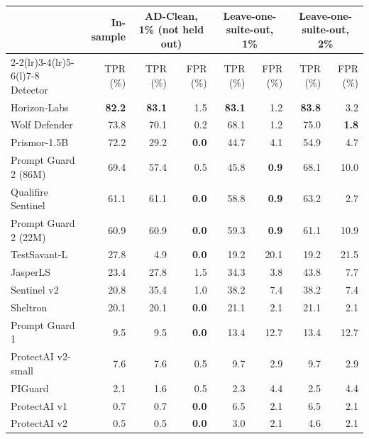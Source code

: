 \begin{tabular*}{\textwidth}{@{\extracolsep{\fill}}lrrrrrrr@{}}
\toprule
 & In-sample & \multicolumn{2}{c}{AD-Clean, 1\% (not held out)} & \multicolumn{2}{c}{Leave-one-suite-out, 1\%} & \multicolumn{2}{c}{Leave-one-suite-out, 2\%} \\
\cmidrule(lr){2-2}\cmidrule(lr){3-4}\cmidrule(lr){5-6}\cmidrule(l){7-8}
Detector & TPR (\%) & TPR (\%) & FPR (\%) & TPR (\%) & FPR (\%) & TPR (\%) & FPR (\%) \\
\midrule
Horizon-Labs & \textbf{82.2} & \textbf{83.1} & 1.5 & \textbf{83.1} & 1.2 & \textbf{83.8} & 3.2 \\
Wolf Defender & 73.8 & 70.1 & 0.2 & 68.1 & 1.2 & 75.0 & \textbf{1.8} \\
Prismor-1.5B & 72.2 & 29.2 & \textbf{0.0} & 44.7 & 4.1 & 54.9 & 4.7 \\
Prompt Guard 2 (86M) & 69.4 & 57.4 & 0.5 & 45.8 & \textbf{0.9} & 68.1 & 10.0 \\
Qualifire Sentinel & 61.1 & 61.1 & \textbf{0.0} & 58.8 & \textbf{0.9} & 63.2 & 2.7 \\
Prompt Guard 2 (22M) & 60.9 & 60.9 & \textbf{0.0} & 59.3 & \textbf{0.9} & 61.1 & 10.9 \\
TestSavant-L & 27.8 & 4.9 & \textbf{0.0} & 19.2 & 20.1 & 19.2 & 21.5 \\
JasperLS & 23.4 & 27.8 & 1.5 & 34.3 & 3.8 & 43.8 & 7.7 \\
Sentinel v2 & 20.8 & 35.4 & 1.0 & 38.2 & 7.4 & 38.2 & 7.4 \\
Sheltron & 20.1 & 20.1 & \textbf{0.0} & 21.1 & 2.1 & 21.1 & 2.1 \\
Prompt Guard 1 & 9.5 & 9.5 & \textbf{0.0} & 13.4 & 12.7 & 13.4 & 12.7 \\
ProtectAI v2-small & 7.6 & 7.6 & 0.5 & 9.7 & 2.9 & 9.7 & 2.9 \\
PIGuard & 2.1 & 1.6 & 0.5 & 2.3 & 4.4 & 2.5 & 4.4 \\
ProtectAI v1 & 0.7 & 0.7 & \textbf{0.0} & 6.5 & 2.1 & 6.5 & 2.1 \\
ProtectAI v2 & 0.5 & 0.5 & \textbf{0.0} & 3.0 & 2.1 & 4.6 & 2.1 \\
\bottomrule
\end{tabular*}
